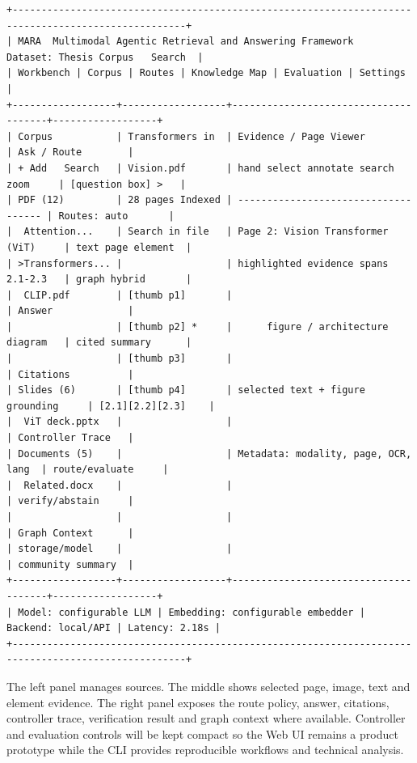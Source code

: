 \documentclass[a4paper,11pt]{article}
\begin{document}
\begin{Verbatim}[fontsize=\tiny]
+----------------------------------------------------------------------------------------------------+
| MARA  Multimodal Agentic Retrieval and Answering Framework      Dataset: Thesis Corpus   Search  |
| Workbench | Corpus | Routes | Knowledge Map | Evaluation | Settings                              |
+------------------+------------------+--------------------------------------+------------------+
| Corpus           | Transformers in  | Evidence / Page Viewer               | Ask / Route        |
| + Add   Search   | Vision.pdf       | hand select annotate search zoom     | [question box] >   |
| PDF (12)         | 28 pages Indexed | ------------------------------------ | Routes: auto       |
|  Attention...    | Search in file   | Page 2: Vision Transformer (ViT)     | text page element  |
| >Transformers... |                  | highlighted evidence spans 2.1-2.3   | graph hybrid       |
|  CLIP.pdf        | [thumb p1]       |                                      | Answer             |
|                  | [thumb p2] *     |      figure / architecture diagram   | cited summary      |
|                  | [thumb p3]       |                                      | Citations          |
| Slides (6)       | [thumb p4]       | selected text + figure grounding     | [2.1][2.2][2.3]    |
|  ViT deck.pptx   |                  |                                      | Controller Trace   |
| Documents (5)    |                  | Metadata: modality, page, OCR, lang  | route/evaluate     |
|  Related.docx    |                  |                                      | verify/abstain     |
|                  |                  |                                      | Graph Context      |
| storage/model    |                  |                                      | community summary  |
+------------------+------------------+--------------------------------------+------------------+
| Model: configurable LLM | Embedding: configurable embedder | Backend: local/API | Latency: 2.18s |
+----------------------------------------------------------------------------------------------------+
\end{Verbatim}

The left panel manages sources. The middle shows selected page, image, text and element evidence. The right panel exposes the route policy, answer, citations, controller trace, verification result and graph context where available. Controller and evaluation controls will be kept compact so the Web UI remains a product prototype while the CLI provides reproducible workflows and technical analysis.
\end{document}
